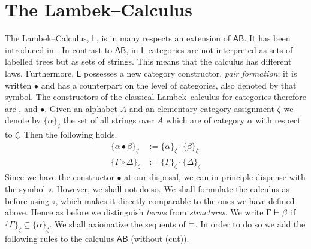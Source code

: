 \section{The Lambek--Calculus}
\label{kap:lambek}
%
%
%
The Lambek--Calculus, $\mathsf{L}$, is in many respects an extension of
$\mathsf{AB}$. It has been introduced in \cite{lambek:mathematics}. In
contrast to $\mathsf{AB}$, in $\mathsf{L}$ categories are not interpreted 
as sets of labelled trees but as sets of strings. This means that the
calculus has different laws. Furthermore, $\mathsf{L}$ possesses a new
category constructor, {\it pair formation\/}; it is written $\bullet$ 
and has a counterpart on the level of categories, also denoted by that 
symbol. The constructors of the classical Lambek--calculus for 
categories therefore are {\mtt{\tb}}, {\mtt{\tf}} and $\bullet$. 
Given an alphabet $A$ and an elementary category assignment $\zeta$
we denote by $\{\alpha\}_{\zeta}$ the set of all strings over $A$ 
which are of category $\alpha$ with respect to $\zeta$. Then the 
following holds.
\begin{equation}
\begin{split}
\{\alpha \bullet \beta\}_{\zeta}  &
        := \{\alpha\}_{\zeta} \cdot \{\beta\}_{\zeta} \\
\mbox{}\{\Gamma \circ \Delta\}_{\zeta}   &
    := \{\Gamma\}_{\zeta} \cdot \{\Delta\}_{\zeta}
\end{split}
\end{equation}
Since we have the constructor $\bullet$ at our disposal, we
can in principle dispense with the symbol $\circ$. However,
we shall not do so. We shall formulate the calculus as before
using $\circ$, which makes it directly comparable to the ones
we have defined above. Hence as before we distinguish {\it terms\/}
from {\it structures}. We write $\Gamma \boldsymbol{\vdash} \beta$ if
$\{ \Gamma \}_{\zeta} \subseteq \{ \alpha\}_{\zeta}$.  We shall
axiomatize the sequents of $\boldsymbol{\vdash}$. In order to do so we add
the following rules to the calculus $\mathsf{AB}$ (without (cut)).
